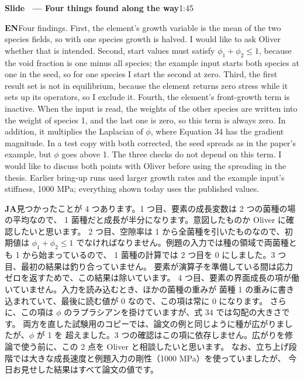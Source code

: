 \documentclass[11pt,a4paper]{article}
\newcounter{sl}
\newcommand{\slide}[2]{\stepcounter{sl}\vspace{8pt}%
  {\color{c3}\large\bfseries Slide \thesl\ --- #1}\hfill{\small #2}\par\vspace{2pt}}
\newcommand{\EN}{\textbf{EN}\quad}
\newcommand{\JA}{\par\textbf{JA}\quad}
\begin{document}
\slide{Four things found along the way}{1:45}
\EN Four findings. First, the element's growth variable is the mean of the two
species fields, so with one species growth is halved. I would like to ask
Oliver whether that is intended. Second, start values must satisfy
$\phi_1+\phi_2\le1$, because the void fraction is one minus all
species; the example input starts both species at one in the seed, so for one
species I start the second at zero. Third, the first result set is not in
equilibrium, because the element returns zero stress while it sets up its
operators, so I exclude it. Fourth, the element's front-growth term is
inactive. When the input is read, the weights of the other species are written
into the weight of species 1, and the last one is zero, so this term is always
zero. In addition, it multiplies the Laplacian of $\phi$, where Equation 34 has
the gradient magnitude. In a test copy with both corrected, the seed spreads
as in the paper's example, but $\phi$ goes above 1. The three checks do not
depend on this term. I would like to discuss both points with Oliver before
using the spreading in the thesis. Earlier bring-up runs used larger growth rates
and the example input's stiffness, 1000 MPa; everything shown today uses the
published values.
\JA 見つかったことが 4 つあります。1 つ目、要素の成長変数は 2 つの菌種の場の平均なので、
1 菌種だと成長が半分になります。意図したものか Oliver に確認したいと思います。
2 つ目、空隙率は 1 から全菌種を引いたものなので、初期値は $\phi_1+\phi_2\le1$
でなければなりません。例題の入力では種の領域で両菌種とも 1 から始まっているので、
1 菌種の計算では 2 つ目を 0 にしました。3 つ目、最初の結果は釣り合っていません。
要素が演算子を準備している間は応力ゼロを返すためで、この結果は除いています。
4 つ目、要素の界面成長の項が働いていません。入力を読み込むとき、ほかの菌種の重みが
菌種 1 の重みに書き込まれていて、最後に読む値が 0 なので、この項は常に 0 になります。
さらに、この項は $\phi$ のラプラシアンを掛けていますが、式 34 では勾配の大きさです。
両方を直した試験用のコピーでは、論文の例と同じように種が広がりましたが、$\phi$ が 1 を
超えました。3 つの確認はこの項に依存しません。広がりを修論で使う前に、この 2 点を
Oliver と相談したいと思います。
なお、立ち上げ段階では大きな成長速度と例題入力の剛性（1000 MPa）を使っていましたが、
今日お見せした結果はすべて論文の値です。
\end{document}
